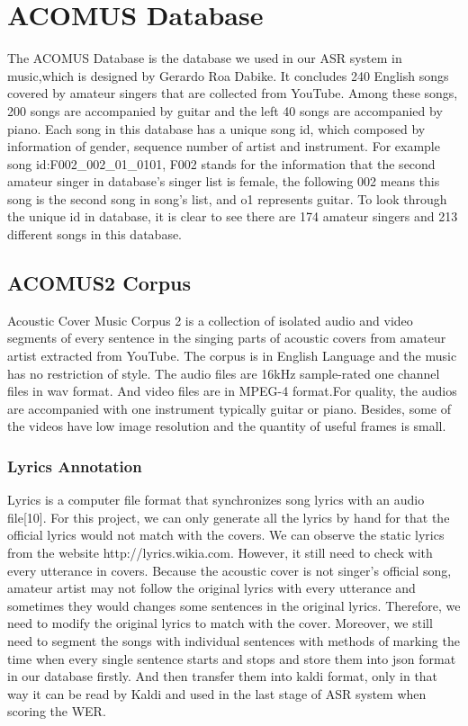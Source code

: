 \chapter{ACOMUS Database}
The ACOMUS Database is the database we used in our ASR system in music,which is designed by Gerardo Roa Dabike. It concludes 240 English songs covered by amateur singers that are collected from YouTube. Among these songs, 200 songs are accompanied by guitar and the left 40 songs are accompanied by piano. Each song in this database has a unique song id, which composed by information of gender, sequence number of artist and instrument. For example song id:F002\_002\_01\_0101, F002 stands for the information that the second amateur singer in database's singer list is female, the following 002 means this song is the second song in song's list, and o1 represents guitar.
To look through the unique id in database, it is clear to see there are 174 amateur singers and 213 different songs in this database.


\section{ACOMUS2 Corpus}
Acoustic Cover Music Corpus 2 is a collection of isolated audio and video segments of every sentence in the singing parts of acoustic covers from amateur artist extracted from YouTube. The corpus is in English Language and the music has no restriction of style. The audio files are 16kHz sample-rated one channel files in wav format. And video files are in MPEG-4 format.For quality, the audios are accompanied with one instrument typically guitar or piano. Besides, some of the videos have low image resolution and the quantity of useful frames is small.

     
        
\subsection{Lyrics Annotation}
Lyrics is a computer file format that synchronizes song lyrics with an audio file[10]. For this project, we can only generate all the lyrics by hand for that the official lyrics would not match with the covers. We can observe the static lyrics from the website http://lyrics.wikia.com. However, it still need to check with every utterance in covers. Because the acoustic cover is not singer's official song, amateur artist may not follow the original lyrics with every utterance and sometimes they would changes some sentences in the original lyrics. Therefore, we need to modify the original lyrics to match with the cover. Moreover, we still need to segment the songs with individual sentences with methods of marking the time when every single sentence starts and stops and store them into json format in our database firstly. And then transfer them into kaldi format, only in that way it can be read by Kaldi and used in the last stage of ASR system when scoring the WER.   

